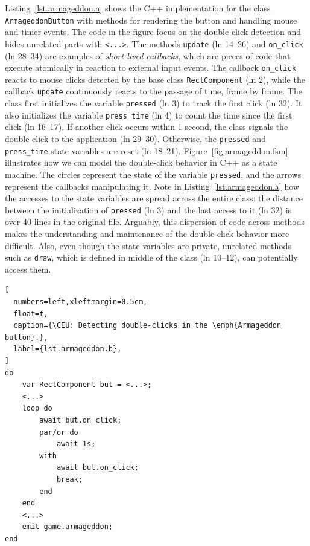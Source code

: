 \documentclass[10pt, conference, compsocconf]{IEEEtran}
\newcommand{\CEU}{\textsc{C\'{e}u}\xspace}
\newcommand{\code}[1] {{\small{\texttt{#1}}}}
\begin{document}
Listing~\ref{lst.armageddon.a} shows the C++ implementation for the class
\code{ArmageddonButton} with methods for rendering the button and handling
mouse and timer events.
The code in the figure focus on the double click detection and hides unrelated
parts with \code{<...>}.
%
The methods \code{update} (ln 14--26) and \code{on\_click} (ln 28--34) are
examples of \emph{short-lived callbacks}, which are pieces of code that execute
atomically in reaction to external input events.
The callback \code{on\_click} reacts to mouse clicks detected by the base class
\code{RectComponent} (ln 2), while the callback \code{update} continuously
reacts to the passage of time, frame by frame.
%
%
The class first initializes the variable \code{pressed} (ln 3) to track the
first click (ln 32).
It also initializes the variable \code{press\_time} (ln 4) to count the time
since the first click (ln 16--17).
If another click occurs within 1 second, the class signals the double click to
the application (ln 29--30).
Otherwise, the \code{pressed} and \code{press\_time} state variables are reset
(ln 18--21).
%
Figure~\ref{fig.armageddon.fsm} illustrates how we can model the double-click 
behavior in C++ as a state machine.
The circles represent the state of the variable \code{pressed}, and the arrows 
represent the callbacks manipulating it.
%
Note in Listing~\ref{lst.armageddon.a} how the accesses to the state variables
are spread across the entire class: the distance between the initialization of
\code{pressed} (ln 3) and the last access to it (ln 32) is over 40 lines in
the original file.
Arguably, this dispersion of code across methods makes the understanding and 
maintenance of the double-click behavior more difficult.
Also, even though the state variables are private, unrelated methods such as 
\code{draw}, which is defined in middle of the class (ln 10--12), can
potentially access them.

\begin{lstlisting}[
  numbers=left,xleftmargin=0.5cm,
  float=t,
  caption={\CEU: Detecting double-clicks in the \emph{Armageddon button}.},
  label={lst.armageddon.b},
]
do
    var RectComponent but = <...>;
    <...>
    loop do
        await but.on_click;
        par/or do
            await 1s;
        with
            await but.on_click;
            break;
        end
    end
    <...>
    emit game.armageddon;
end
\end{lstlisting}
\end{document}

